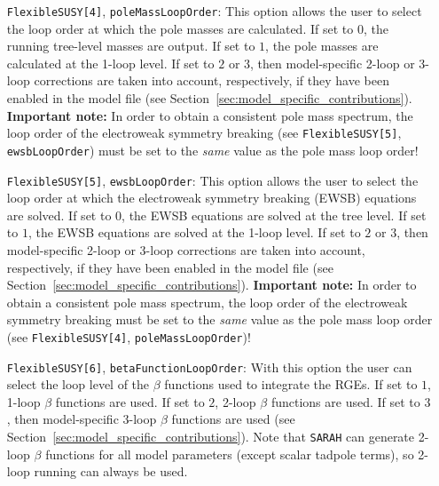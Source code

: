 \documentclass[final,3p,11pt,pdflatex]{elsarticle}
\makeatletter
\newcommand{\sarah}{\texttt{SARAH}\@\xspace}
\newcommand{\secref}[1]{Section~\ref{#1}}
\makeatother
\begin{document}
\begin{itemize}
\item[\texttt{FlexibleSUSY[4]},] \texttt{poleMassLoopOrder}: This
  option allows the user to select the loop order at which the pole
  masses are calculated.  If set to $0$, the running tree-level masses
  are output.  If set to $1$, the pole masses are calculated at the
  1-loop level.  If set to $2$ or $3$, then model-specific 2-loop or
  3-loop corrections are taken into account, respectively, if they have been
  enabled in the model file (see
  \secref{sec:model_specific_contributions}).  \textbf{Important
    note:} In order to obtain a consistent pole mass spectrum, the
  loop order of the electroweak symmetry breaking (see
  \texttt{FlexibleSUSY[5]}, \texttt{ewsbLoopOrder}) must be set to the
  \emph{same} value as the pole mass loop order!

\item[\texttt{FlexibleSUSY[5]},] \texttt{ewsbLoopOrder}: This option
  allows the user to select the loop order at which the electroweak
  symmetry breaking (EWSB) equations are solved.  If set to $0$, the
  EWSB equations are solved at the tree level.  If set to $1$, the
  EWSB equations are solved at the 1-loop level.  If set to $2$ or
  $3$, then model-specific 2-loop or 3-loop corrections are taken into
  account, respectively, if they have been enabled in the model file (see
  \secref{sec:model_specific_contributions}).  \textbf{Important
    note:} In order to obtain a consistent pole mass spectrum, the
  loop order of the electroweak symmetry breaking must be set to the
  \emph{same} value as the pole mass loop order (see
  \texttt{FlexibleSUSY[4]}, \texttt{poleMassLoopOrder})!

\item[\texttt{FlexibleSUSY[6]},] \texttt{betaFunctionLoopOrder}: With
  this option the user can select the loop level of the $\beta$
  functions used to integrate the RGEs.  If set to $1$, 1-loop $\beta$
  functions are used.  If set to $2$, 2-loop $\beta$ functions are used.  If
  set to $3$, then model-specific 3-loop $\beta$ functions are used (see
  \secref{sec:model_specific_contributions}).  Note that \sarah can
  generate 2-loop $\beta$ functions for all model parameters (except
  scalar tadpole terms), so 2-loop running can always be used.


\end{itemize}
\end{document}
